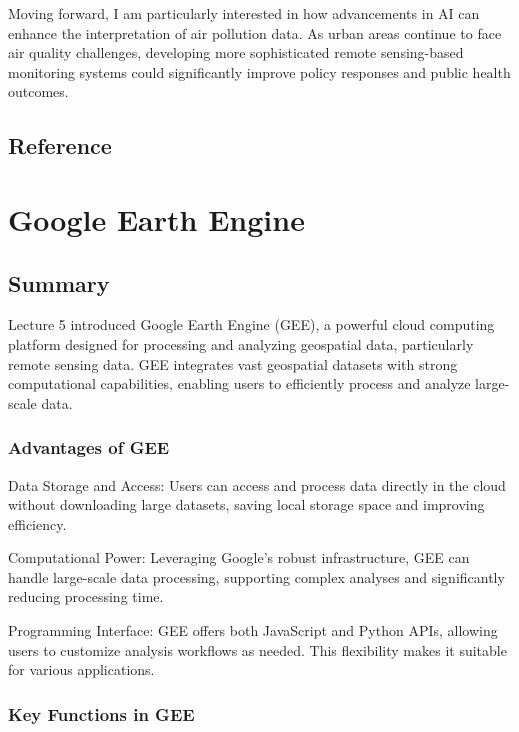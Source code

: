 \documentclass[
  letterpaper,
]{scrbook}
\begin{document}
Moving forward, I am particularly interested in how advancements in AI
can enhance the interpretation of air pollution data. As urban areas
continue to face air quality challenges, developing more sophisticated
remote sensing-based monitoring systems could significantly improve
policy responses and public health outcomes.

\section{Reference}\label{reference-2}


\chapter{Google Earth Engine}\label{google-earth-engine}

\section{Summary}\label{summary-2}

Lecture 5 introduced Google Earth Engine (GEE), a powerful cloud
computing platform designed for processing and analyzing geospatial
data, particularly remote sensing data. GEE integrates vast geospatial
datasets with strong computational capabilities, enabling users to
efficiently process and analyze large-scale data.

\subsection{Advantages of GEE}\label{advantages-of-gee}

Data Storage and Access: Users can access and process data directly in
the cloud without downloading large datasets, saving local storage space
and improving efficiency.

Computational Power: Leveraging Google's robust infrastructure, GEE can
handle large-scale data processing, supporting complex analyses and
significantly reducing processing time.

Programming Interface: GEE offers both JavaScript and Python APIs,
allowing users to customize analysis workflows as needed. This
flexibility makes it suitable for various applications.

\subsection{Key Functions in GEE}\label{key-functions-in-gee}
\end{document}
